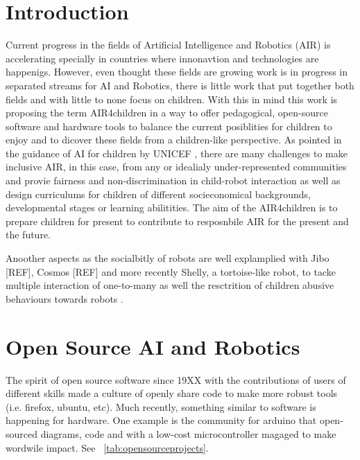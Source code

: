 \documentclass[sigconf]{acmart}
\begin{document}
\maketitle

\section{Introduction}

Current progress in the fields of Artificial Intelligence and Robotics (AIR)
is accelerating specially in countries where innonavtion and technologies are happenigs. 
However, even thought these fields are growing work is in progress in separated streams
for AI and Robotics, there is little work that put together both fields and with
little to none focus on children. With this in mind this work is proposing 
the term AIR4children in a way to offer pedagogical, open-source software and hardware
tools to balance the current posiblities for children to enjoy and to dicover these 
fields from a children-like perspective.
As pointed in the guidance of AI for children by UNICEF \cite{UNICEF2020},
there are many challenges to make inclusive AIR, in this case, 
from any or idealialy under-represented communities and provie fairness and non-discrimination 
in child-robot interaction as well as design curriculums for children of different 
socieconomical backgrounds, developmental stages or learning abilitities. 
The aim of the AIR4children is to prepare children for present 
to contribute to resposnbile AIR for the present and the future.

Anoother aspects as the socialbitly of robots are well explamplied with 
Jibo [REF], Cosmos [REF] and more recently Shelly, a tortoise-like robot, to tacke 
multiple interaction of one-to-many as well the resctrition of children
abusive behaviours towards robots \cite{hu2018}. 


\section{Open Source AI and Robotics}
The spirit of open source software since 19XX with the contributions 
of users of different skills made a culture of openly share code to make
more robust tools (i.e. firefox, ubuntu, etc). Much recently, something 
similar to software is happening for hardware. One example is the community 
for arduino that open-sourced diagrams, code and with a low-cost microcontroller
magaged to make wordwile impact. See ~\ref{tab:opensourceprojects}.
\end{document}
